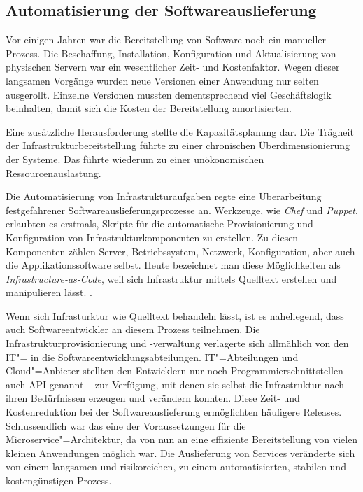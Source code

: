 \subsection{Automatisierung der Softwareauslieferung}

Vor einigen Jahren war die Bereitstellung von Software noch ein manueller Prozess. Die Beschaffung, Installation, Konfiguration und Aktualisierung von physischen Servern war ein wesentlicher Zeit- und Kostenfaktor. Wegen dieser langsamen Vorgänge wurden neue Versionen einer Anwendung nur selten ausgerollt. Einzelne Versionen mussten dementsprechend viel Geschäftslogik beinhalten, damit sich die Kosten der Bereitstellung amortisierten.

Eine zusätzliche Herausforderung stellte die Kapazitätsplanung dar. Die Trägheit der Infrastrukturbereitstellung führte zu einer chronischen Überdimensionierung der Systeme. Das führte wiederum zu einer unökonomischen Ressourcenauslastung.

Die Automatisierung von Infrastrukturaufgaben regte eine Überarbeitung festgefahrener Softwareauslieferungsprozesse an. Werkzeuge, wie \textit{Chef} und \textit{Puppet}, erlaubten es erstmals, Skripte für die automatische Provisionierung und Konfiguration von Infrastrukturkomponenten zu erstellen. Zu diesen Komponenten zählen Server, Betriebssystem, Netzwerk, Konfiguration, aber auch die Applikationssoftware selbst. Heute bezeichnet man diese Möglichkeiten als \textit{Infrastructure-as-Code}, weil sich Infrastruktur mittels Quelltext erstellen und manipulieren lässt. \cite[135]{Httermann:2012:DD:2380958}.

Wenn sich Infrasturktur wie Quelltext behandeln lässt, ist es naheliegend, dass auch Softwareentwickler an diesem Prozess teilnehmen. Die Infrastrukturprovisionierung und -verwaltung verlagerte sich allmählich von den IT"= in die Softwareentwicklungsabteilungen. IT"=Abteilungen und Cloud"=Anbieter stellten den Entwicklern nur noch Programmierschnittstellen -- auch API genannt -- zur Verfügung, mit denen sie selbst die Infrastruktur nach ihren Bedürfnissen erzeugen und verändern konnten. Diese Zeit- und Kostenreduktion bei der Softwareauslieferung ermöglichten häufigere Releases. Schlussendlich war das eine der Voraussetzungen für die Microservice"=Architektur, da von nun an eine effiziente Bereitstellung von vielen kleinen Anwendungen möglich war. Die Auslieferung von Services veränderte sich von einem langsamen und risikoreichen, zu einem automatisierten, stabilen und kostengünstigen Prozess.

